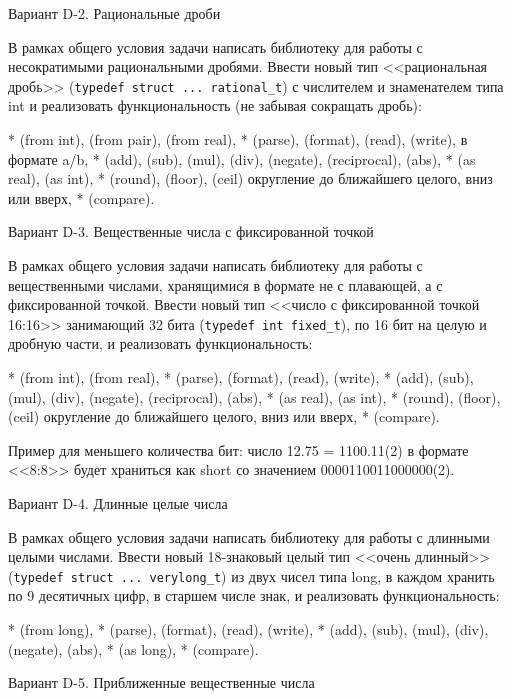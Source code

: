 Вариант D-2. Рациональные дроби

В рамках общего условия задачи написать библиотеку для работы с несократимыми
рациональными дробями. Ввести новый тип <<рациональная дробь>> 
(\verb|typedef struct ... rational_t|) с числителем и знаменателем типа int и реализовать
функциональность (не забывая сокращать дробь):

* (from int), (from pair), (from real),
* (parse), (format), (read), (write), в формате a/b,
* (add), (sub), (mul), (div), (negate), (reciprocal), (abs),
* (as real), (as int),
* (round), (floor), (ceil) округление до ближайшего целого, вниз или вверх,
* (compare).


Вариант D-3. Вещественные числа с фиксированной точкой

В рамках общего условия задачи написать библиотеку для работы с вещественными
числами, хранящимися в формате не с плавающей, а с фиксированной точкой.
Ввести новый тип <<число с фиксированной точкой 16:16>> занимающий 32 бита
(\verb|typedef int fixed_t|), по 16 бит на целую и дробную части, и реализовать
функциональность:

* (from int), (from real),
* (parse), (format), (read), (write),
* (add), (sub), (mul), (div), (negate), (reciprocal), (abs),
* (as real), (as int),
* (round), (floor), (ceil) округление до ближайшего целого, вниз или вверх,
* (compare).

Пример для меньшего количества бит: число 12.75 = 1100.11(2) в формате <<8:8>>
будет храниться как short со значением 0000110011000000(2).


Вариант D-4. Длинные целые числа

В рамках общего условия задачи написать библиотеку для работы с длинными
целыми числами. Ввести новый 18-знаковый целый тип <<очень длинный>>
(\verb|typedef struct ... verylong_t|) из двух чисел типа long, в каждом хранить по 9 десятичных
цифр, в старшем числе знак, и реализовать функциональность:

* (from long),
* (parse), (format), (read), (write),
* (add), (sub), (mul), (div), (negate), (abs),
* (as long),
* (compare).


Вариант D-5. Приближенные вещественные числа


